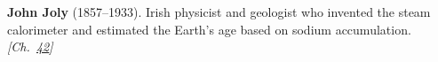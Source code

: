 \textbf{John Joly} (1857–1933). Irish physicist and geologist who invented the steam calorimeter and estimated the Earth's age based on sodium accumulation. \emph{[Ch.~\hyperref[ch:iceslipperiness]{42}]}


